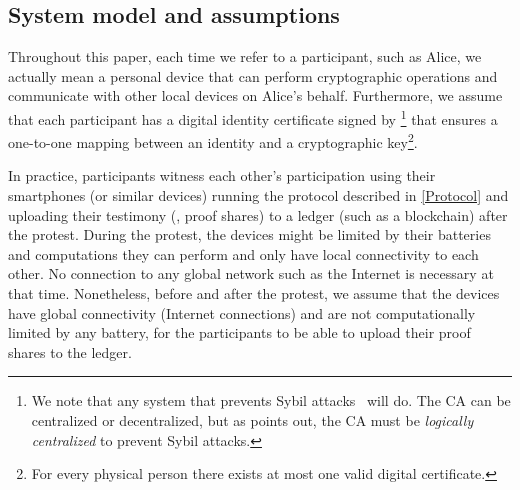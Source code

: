 \subsection{System model and assumptions}%
\label{assumptions}

Throughout this paper, each time we refer to a participant, such as Alice, we 
actually mean a personal device that can perform cryptographic operations and 
communicate with other local devices on Alice's behalf.
Furthermore, we assume that each participant has a digital identity certificate signed 
by \footnote{%
  We note that any system that prevents Sybil attacks~\cite{SybilAttack} will 
  do.
  The \ac{CA} can be centralized or decentralized, but as 
  \textcite{SybilAttack} points out, the \ac{CA} must be \emph{logically 
    centralized} to prevent Sybil attacks.
 } that ensures a one-to-one mapping between an identity and a cryptographic 
key\footnote{%
  For every physical person there exists at most one valid digital certificate.
}.

In practice, participants witness each other's participation using
their smartphones (or similar devices) running the protocol described
in \cref{Protocol} and uploading their testimony (\ie, proof shares)
to a ledger (such as a blockchain) after the protest.  During the
protest, the devices might be limited by their batteries and
computations they can perform and only have local connectivity to each
other.  No connection to any global network such as the Internet is
necessary at that time.  Nonetheless, before and after the protest, we
assume that the devices have global connectivity (\ie Internet
connections) and are not computationally limited by any battery, for
the participants to be able to upload their proof shares to the
ledger.



